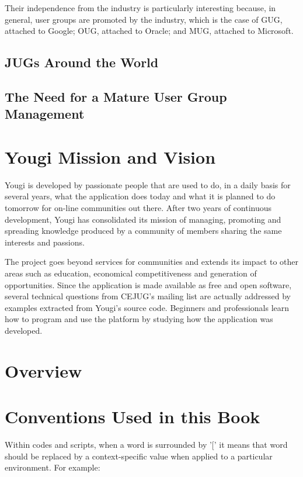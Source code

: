 \documentclass[envcountsame,envcountchap]{svmono}
\begin{document}
Their independence from the industry is particularly interesting because, in general, user groups are promoted by the industry, which is the case of GUG, attached to Google; OUG, attached to Oracle; and MUG, attached to Microsoft.

\subsection{JUGs Around the World}

\subsection{The Need for a Mature User Group Management}

\section{Yougi Mission and Vision}

Yougi is developed by passionate people that are used to do, in a daily basis for several years, what the application does today and what it is planned to do tomorrow for on-line communities out there. After two years of continuous development, Yougi has consolidated its mission of managing, promoting and spreading knowledge produced by a community of members sharing the same interests and passions.

The project goes beyond services for communities and extends its impact to other areas such as education, economical competitiveness and generation of opportunities. Since the application is made available as free and open software, several technical questions from CEJUG's mailing list are actually addressed by examples extracted from Yougi's source code. Beginners and professionals learn how to program and use the platform by studying how the application was developed.

\section{Overview}

\section{Conventions Used in this Book}

Within codes and scripts, when a word is surrounded by '[' it means that word should be replaced by a context-specific value when applied to a particular environment. For example:
\end{document}
